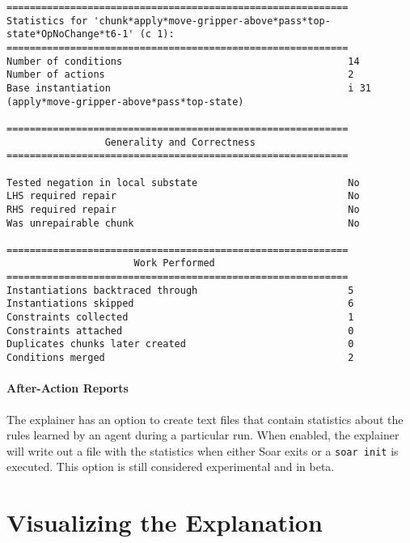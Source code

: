 {\scriptsize
\begin{verbatim}
===========================================================
Statistics for 'chunk*apply*move-gripper-above*pass*top-state*OpNoChange*t6-1' (c 1):
===========================================================
Number of conditions                                       14
Number of actions                                          2
Base instantiation                                         i 31 (apply*move-gripper-above*pass*top-state)

===========================================================
                 Generality and Correctness
===========================================================

Tested negation in local substate                          No
LHS required repair                                        No
RHS required repair                                        No
Was unrepairable chunk                                     No

===========================================================
                      Work Performed
===========================================================
Instantiations backtraced through                          5
Instantiations skipped                                     6
Constraints collected                                      1
Constraints attached                                       0
Duplicates chunks later created                            0
Conditions merged                                          2
\end{verbatim}
}

\paragraph{After-Action Reports}

The explainer has an option to create text files that contain statistics
about the rules learned by an agent during a particular run. When
enabled, the explainer will write out a file with the statistics when
either Soar exits or a \texttt{soar\ init} is executed. This option is
still considered experimental and in beta.


\section{Visualizing the Explanation}


